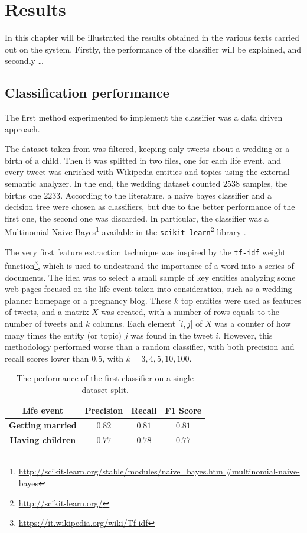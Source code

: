 \chapter{Results}
\label{cha:results}
In this chapter will be illustrated the results obtained in the various texts carried out on the system. Firstly, the performance of the classifier will be explained, and secondly \dots

\section{Classification performance}
The first method experimented to implement the classifier was a data driven approach. 

The dataset taken from \cite{dickinson2015identifying} was filtered, keeping only tweets about a wedding or a birth of a child. Then it was splitted in two files, one for each life event, and every tweet was enriched with Wikipedia entities and topics using the external semantic analyzer. In the end, the wedding dataset counted $2538$ samples, the births one $2233$. According to the literature, a naive bayes classifier and a decision tree were chosen as classifiers, but due to the better performance of the first one, the second one was discarded. In particular, the classifier was a Multinomial Naive Bayes\footnote{\url{http://scikit-learn.org/stable/modules/naive_bayes.html#multinomial-naive-bayes}} available in the \texttt{scikit-learn}\footnote{\url{http://scikit-learn.org/}} library \cite{scikit-learn}.

The very first feature extraction technique was inspired by the \texttt{tf-idf} weight function\footnote{\url{https://it.wikipedia.org/wiki/Tf-idf}}, which is used to undestrand the importance of a word into a series of documents. The idea was to select a small sample of key entities analyzing some web pages focused on the life event taken into consideration, such as a wedding planner homepage or a pregnancy blog. These $k$ top entities were used as features of tweets, and a matrix $X$ was created, with a number of rows equals to the number of tweets and $k$ columns. Each element [$i,j$] of $X$ was a counter of how many times the entity (or topic) $j$ was found in the tweet $i$. However, this methodology performed worse than a random classifier, with both precision and recall scores lower than $0.5$, with $k = 3, 4, 5, 10, 100$.

\begin{table}
\begin{center}
\begin{tabular}{cccc}
\hline
Life event & Precision & Recall & F1 Score \\
\hline
\textbf{Getting married} & $0.82$ & $0.81$ & $0.81$ \\
\textbf{Having children} & $0.77$ & $0.78$ & $0.77$ \\
\hline
\end{tabular}
\end{center}
\caption{The performance of the first classifier on a single dataset split.}
\label{tab:singlesplit}
\end{table}

